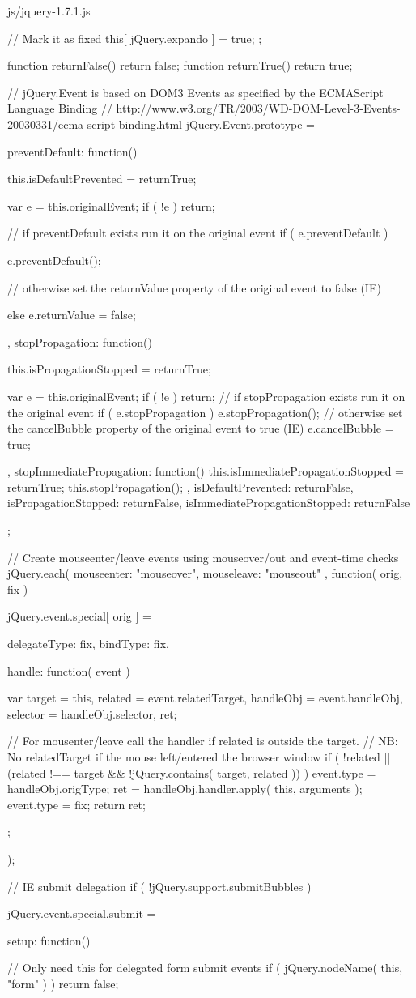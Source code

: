 \documentclass{article}
\begin{document}
\begin{chunk}{js/jquery-1.7.1.js}
{{	// Mark it as fixed
	this[ jQuery.expando ] = true;
};

function returnFalse() {
	return false;
}
function returnTrue() {
	return true;
}

// jQuery.Event is based on DOM3 Events as specified by the ECMAScript Language Binding
// http://www.w3.org/TR/2003/WD-DOM-Level-3-Events-20030331/ecma-script-binding.html
jQuery.Event.prototype = {
	preventDefault: function() {
		this.isDefaultPrevented = returnTrue;

		var e = this.originalEvent;
		if ( !e ) {
			return;
		}

		// if preventDefault exists run it on the original event
		if ( e.preventDefault ) {
			e.preventDefault();

		// otherwise set the returnValue property of the original event to false (IE)
		} else {
			e.returnValue = false;
		}
	},
	stopPropagation: function() {
		this.isPropagationStopped = returnTrue;

		var e = this.originalEvent;
		if ( !e ) {
			return;
		}
		// if stopPropagation exists run it on the original event
		if ( e.stopPropagation ) {
			e.stopPropagation();
		}
		// otherwise set the cancelBubble property of the original event to true (IE)
		e.cancelBubble = true;
	},
	stopImmediatePropagation: function() {
		this.isImmediatePropagationStopped = returnTrue;
		this.stopPropagation();
	},
	isDefaultPrevented: returnFalse,
	isPropagationStopped: returnFalse,
	isImmediatePropagationStopped: returnFalse
};

// Create mouseenter/leave events using mouseover/out and event-time checks
jQuery.each({
	mouseenter: "mouseover",
	mouseleave: "mouseout"
}, function( orig, fix ) {
	jQuery.event.special[ orig ] = {
		delegateType: fix,
		bindType: fix,

		handle: function( event ) {
			var target = this,
				related = event.relatedTarget,
				handleObj = event.handleObj,
				selector = handleObj.selector,
				ret;

			// For mousenter/leave call the handler if related is outside the target.
			// NB: No relatedTarget if the mouse left/entered the browser window
			if ( !related || (related !== target && !jQuery.contains( target, related )) ) {
				event.type = handleObj.origType;
				ret = handleObj.handler.apply( this, arguments );
				event.type = fix;
			}
			return ret;
		}
	};
});

// IE submit delegation
if ( !jQuery.support.submitBubbles ) {

	jQuery.event.special.submit = {
		setup: function() {
			// Only need this for delegated form submit events
			if ( jQuery.nodeName( this, "form" ) ) {
				return false;
			}

}}}}
\end{chunk}
\end{document}
